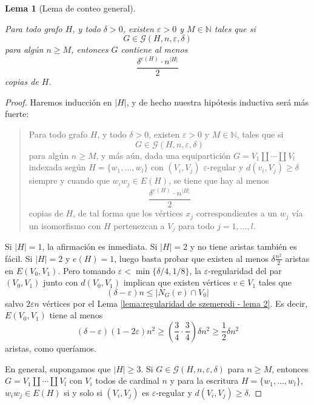 \documentclass[12pt]{report}
\theoremstyle{plain}
\newtheorem{lemma}[theorem]{Lema}
\theoremstyle{definition}
\newcommand{\naturals}{\mathbb{N}}
\newcommand{\abs}[1]{\left \vert #1 \right \vert}
\begin{document}
\begin{lemma}[Lema de conteo general]\label{lema:lema de conteo general - corolario del lema de regularidad de szemeredi}

Para todo grafo $H$, y todo $\delta > 0$, existen $\varepsilon > 0$ y $M \in \naturals$ tales que si
\[
    G \in \mathcal G (H, n, \varepsilon, \delta)
\]
para algún $n \geq M$, entonces $G$ contiene al menos
\[
    \frac{\delta^{e(H)} \cdot n^{\abs H}}{2}
\]
copias de $H$.
\end{lemma}
\begin{proof}
Haremos inducción en $\abs H$, y de hecho nuestra hipótesis inductiva será más fuerte:
\begin{quote}
Para todo grafo $H$, y todo $\delta > 0$, existen $\varepsilon > 0$ y $M \in \naturals$, tales que si
\[
    G \in \mathcal G (H, n , \varepsilon , \delta)
\]
para algún $n \geq M$, y más aún, dada una equipartición $G = V_1 \coprod \cdots \coprod V_l$ indexada según $H = \{w_1, \ldots, w_l\}$ con $(V_i, V_j)$ $\varepsilon$-regular y $d(v_i, V_j) \geq \delta$ siempre y cuando que $w_i w_j \in E(H)$, se tiene que hay al menos
\[
    \frac{\delta^{e(H)} \cdot n^{\abs H}}{2}
\]
copias de $H$, de tal forma que los vértices $x_j$ correspondientes a un $w_j$ vía un isomorfismo con $H$ pertenezcan a $V_j$ para todo $j = 1, \ldots, l$.
\end{quote}
Si $\abs H = 1$, la afirmación es inmediata. Si $\abs H = 2$ y no tiene aristas también es fácil. Si $\abs H = 2$ y $e(H) = 1$, luego basta probar que existen al menos $\delta \frac{n^2}{2}$ aristas en $E(V_0, V_1)$. Pero tomando $\varepsilon < \min \{\delta / 4, 1/8\}$, la $\varepsilon$-regularidad del par $(V_0,V_1)$ junto con $d(V_0,V_1)$ implican que existen vértices $v \in V_1$ tales que
\[
    (\delta - \varepsilon)n \leq \abs{N_G (v) \cap V_0}
\]
salvo $2 \varepsilon n$ vértices por el Lema \ref{lema:regularidad de szemeredi - lema 2}. Es decir, $E(V_0, V_1)$ tiene al menos
\[
    (\delta - \varepsilon)(1-2\varepsilon)n^2 \geq (\frac 3 4 \cdot \frac 3 4) \delta n^2 \geq \frac 1 2 \delta n^2
\]
aristas, como queríamos.

En general, supongamos que $\abs H \geq 3$. Si $G \in \mathcal G (H, n , \varepsilon , \delta)$ para $n \geq M$, entonces $G = V_1 \coprod \cdots \coprod V_l$ con $V_i$ todos de cardinal $n$ y para la escritura $H = \{w_1, \ldots, w_l\}$, $w_i w_j \in E(H)$ si y solo si $(V_i, V_j)$ es $\varepsilon$-regular y $d(V_i, V_j) \geq \delta$.


\end{proof}
\end{document}
